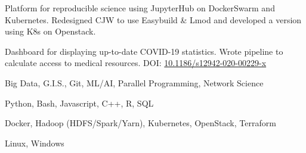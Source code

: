 \documentclass{acmresume}
\begin{document}
        \begin{titemize}
        \end{titemize}
		
        \begin{titemize}
        \end{titemize}
    
    
    

    \begin{titemize}
    	\titem Platform for reproducible science using JupyterHub on DockerSwarm and Kubernetes.
    	\titem Redesigned CJW to use Easybuild \& Lmod and developed a version using K8s on Openstack.
    \end{titemize}
    
    \begin{titemize}
    	\titem Dashboard for displaying up-to-date COVID-19 statistics.
    	\titem Wrote pipeline to calculate access to medical resources. DOI: \href{https://doi.org/10.1186/s12942-020-00229-x}{10.1186/s12942-020-00229-x}
    \end{titemize}
    
    
    
    

        \begin{description}[topsep=0pt,itemsep=0pt]
        	 Big Data, G.I.S., Git, ML/AI, Parallel Programming, Network Science
        	
        	\desc[Languages:] Python, Bash, Javascript, C++, R, SQL
        	
        	\desc[Technologies:] Docker, Hadoop (HDFS/Spark/Yarn), Kubernetes, OpenStack, Terraform
        	
        	 Linux, Windows
        \end{description}

	
\end{document}
